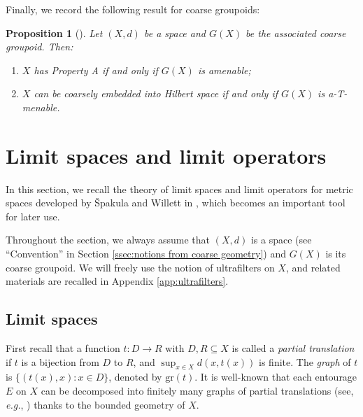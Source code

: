 \documentclass[12pt, a4paper]{amsart}
\numberwithin{equation}{section}
\newtheorem{prop}[thm]{Proposition}
\theoremstyle{definition}
\theoremstyle{remark}
\def\gr{\mathrm{gr}}
\begin{document}
Finally, we record the following result for coarse groupoids:

\begin{prop}[{\cite[Theorem 5.3 and 5.4]{STY02}}]\label{prop:char for amen and a-T-men}
Let $(X,d)$ be a space and $G(X)$ be the associated coarse groupoid. Then:
\begin{enumerate}
 \item $X$ has Property A \emph{if and only if} $G(X)$ is amenable;
 \item $X$ can be coarsely embedded into Hilbert space \emph{if and only if} $G(X)$ is a-T-menable.
\end{enumerate}
\end{prop}



\section{Limit spaces and limit operators}\label{sec:limit sp. and op.}

In this section, we recall the theory of limit spaces and limit operators for metric spaces developed by \v{S}pakula and Willett in \cite{SW17}, which becomes an important tool for later use. 

Throughout the section, we always assume that $(X,d)$ is a space (see ``Convention'' in Section \ref{ssec:notions from coarse geometry}) and $G(X)$ is its coarse groupoid. We will freely use the notion of ultrafilters on $X$, and related materials are recalled in Appendix \ref{app:ultrafilters}.


\subsection{Limit spaces}\label{ssec:limit space} First recall that a function $t: D \to R$ with $D,R \subseteq X$ is called a \emph{partial translation} if $t$ is a bijection from $D$ to $R$, and $\sup_{x\in X}d(x,t(x))$ is finite. The \emph{graph} of $t$ is $\{(t(x),x): x\in D\}$, denoted by $\gr(t)$. It is well-known that each entourage $E$ on $X$ can be decomposed into finitely many graphs of partial translations (see, \emph{e.g.}, \cite[Lemma 4.10]{Roe03}) thanks to the bounded geometry of $X$.
\end{document}
